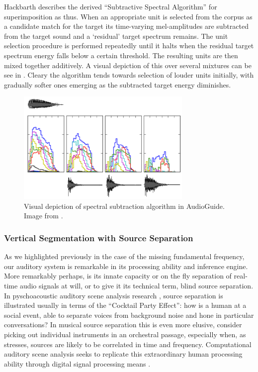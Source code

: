 {{Hackbarth \citep{Hackbarth2010} describes the derived ``Subtractive Spectral Algorithm'' for superimposition as thus. When an appropriate unit is selected from the corpus as a candidate match for the target its time-varying mel-amplitudes are subtracted from the target sound and a `residual' target spectrum remains. The unit selection procedure is performed repeatedly until it halts when the residual target spectrum energy falls below a certain threshold. The resulting units are then mixed together additively. A visual depiction of this over several mixtures can be see in . Cleary the algorithm tends towards selection of louder units initially, with gradually softer ones emerging as the subtracted target energy diminishes. 

\begin{figure}
	\begin{center}
		\includegraphics[width=0.75\textwidth]{ch05_pyconcat/figures/spectrum_subtraction}
	\end{center}
	\caption[Spectral Subtraction Algorithm in AudioGuide]{Visual depiction of spectral subtraction algorithm in AudioGuide. Image from \cite{Hackbarth2010}.}
	\label{fig:spectrum_subtraction}
\end{figure} 

\subsubsection{Vertical Segmentation with Source Separation}

As we highlighted previously in the case of the missing fundamental frequency, our auditory system is remarkable in its processing ability and inference engine. More remarkably perhaps, is its innate capacity or on the fly separation of real-time audio signals at will, or to give it its technical term, blind source separation. In pyschoacoustic auditory scene analysis research \citep{Bregman1994}, source separation is illustrated usually in terms of the ``Cocktail Party Effect'': how is a human at a social event, able to separate voices from background noise and hone in particular conversations? In musical source separation this is even more elusive, consider picking out individual instruments in an orchestral passage, especially when, as \cite{Miron2017a} stresses, sources are likely to be correlated in time and frequency. Computational auditory scene analysis seeks to replicate this extraordinary human processing ability through digital signal processing means \citep{Wang2006}.

}}
